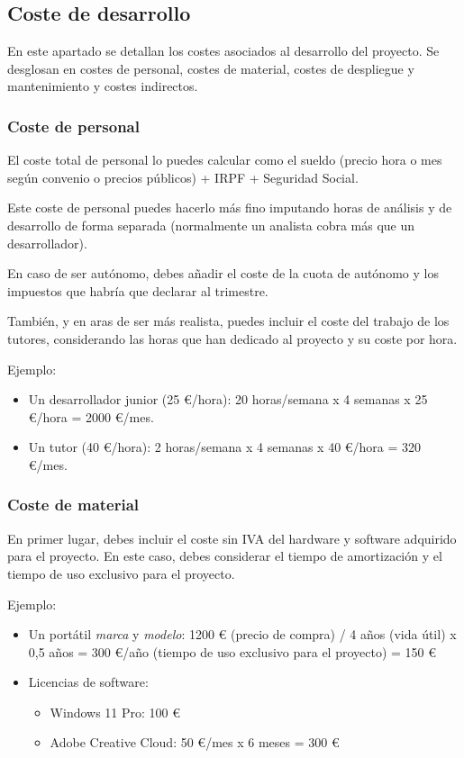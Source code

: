 \subsection{Coste de desarrollo}

En este apartado se detallan los costes asociados al desarrollo del proyecto. Se desglosan en costes de personal, costes de material, costes de despliegue y mantenimiento y costes indirectos.

\subsubsection{Coste de personal}

El coste total de personal lo puedes calcular como el sueldo (precio hora o mes según convenio o precios públicos) + IRPF + Seguridad Social.

Este coste de personal puedes hacerlo más fino imputando horas de análisis y de desarrollo de forma separada (normalmente un analista cobra más que un desarrollador).

En caso de ser autónomo, debes añadir el coste de la cuota de autónomo y los impuestos que habría que declarar al trimestre.

También, y en aras de ser más realista, puedes incluir el coste del trabajo de los tutores, considerando las horas que han dedicado al proyecto y su coste por hora. 

Ejemplo:
\begin{itemize}
\item Un desarrollador junior (25 €/hora): 20 horas/semana x 4 semanas x 25 €/hora = 2000 €/mes.
\item Un tutor (40 €/hora): 2 horas/semana x 4 semanas x 40 €/hora = 320 €/mes.
\end{itemize}

\subsubsection{Coste de material}

En primer lugar, debes incluir el coste sin IVA del hardware y software adquirido para el proyecto. En este caso, debes considerar el tiempo de amortización y el tiempo de uso exclusivo para el proyecto.

Ejemplo:

\begin{itemize}
  
\item Un portátil \textit{marca} y \textit{modelo}: 1200 € (precio de compra) / 4 años (vida útil) x 0,5 años = 300 €/año  (tiempo de uso exclusivo para el proyecto) = 150 €

\item Licencias de software: 
    \begin{itemize}
    \item Windows 11 Pro: 100 €
    \item Adobe Creative Cloud: 50 €/mes x 6 meses = 300 €
    \end{itemize}
\end{itemize}



